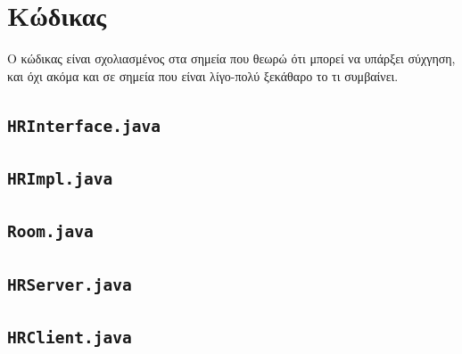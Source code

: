 \documentclass{article}
\begin{document}
\section{Κώδικας}

Ο κώδικας είναι σχολιασμένος στα σημεία που θεωρώ ότι μπορεί να υπάρξει
σύχγηση, και όχι ακόμα και σε σημεία που είναι λίγο-πολύ ξεκάθαρο το τι
συμβαίνει.

\subsection{\lstinline{HRInterface.java}}


\pagebreak

\subsection{\lstinline{HRImpl.java}}


\pagebreak

\subsection{\lstinline{Room.java}}


\pagebreak

\subsection{\lstinline{HRServer.java}}


\pagebreak

\subsection{\lstinline{HRClient.java}}


\pagebreak
\end{document}
